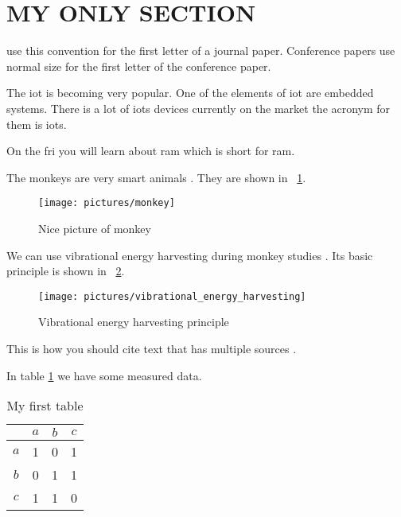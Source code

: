\section{MY ONLY SECTION}

	\ifCLASSOPTIONjournal
		 use this convention for the first letter of a journal paper.
	\else
		Conference papers use normal size for the first letter of the conference paper.
	\fi	

The \ac{iot} is becoming very popular. One of the elements of \ac{iot} are embedded systems. There is a lot of \aclp{iot} devices currently on the market the acronym for them is \acsp{iot}.

On the \acf{fri} you will learn about \acs{ram} which is short for \acl{ram}.

The monkeys are very smart animals \cite{article_first}. They are shown in \figurename ~\ref{fig:monkey}. 

\begin{figure}[ht]
	\centering
	\texttt{[image: pictures/monkey]}
	\caption{Nice picture of monkey \cite{figure_first}}
	\label{fig:monkey}
\end{figure}


We can use vibrational energy harvesting during monkey studies \cite{article_second}. Its basic principle is shown in \figurename  ~\ref{fig:vibrationalenergyharvesting}.

\begin{figure}[ht]
	\centering
	\texttt{[image: pictures/vibrational\_energy\_harvesting]}
	\caption{Vibrational energy harvesting principle \cite{figure_second}}
	\label{fig:vibrationalenergyharvesting}
\end{figure}

This is how you should cite text that has multiple sources \cite{article_first, article_second}.

In table \ref{tab:first_table} we have some measured data.

\begin{table}[ht]
	\centering
	\caption{My first table}
	\label{tab:first_table}
	\begin{tabular}{|c|c|c|c|}
		\hline
		& $a$ & $b$ & $c$ \\
		\hline
		$a$ & 1 & 0 & 1 \\
		\hline
		$b$ & 0 & 1 & 1 \\
		\hline
		$c$ & 1 & 1 & 0 \\
		\hline
	\end{tabular}
\end{table}

